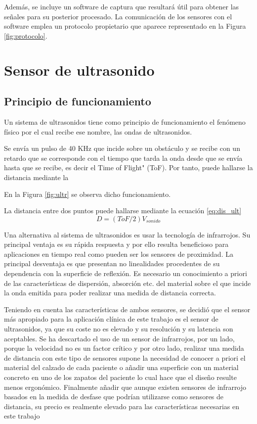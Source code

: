 Además, se incluye un software de captura que resultará útil para obtener las señales para su posterior procesado. La comunicación de los sensores con el software emplea un protocolo propietario que aparece representado en la Figura \ref{fig:protocolo}.

	
\section{Sensor de ultrasonido}

\subsection{Principio de funcionamiento}
Un sistema de ultrasonidos tiene como principio de funcionamiento el fenómeno físico por el cual recibe ese nombre, las ondas de ultrasonidos.

Se envía un pulso de 40 KHz que incide sobre un obstáculo y se recibe con un retardo que se corresponde con el tiempo que tarda la onda desde que se envía hasta que se recibe, es decir el Time of Flight" (ToF). Por tanto, puede hallarse la distancia mediante la 

	 En la Figura \ref{fig:ultr} se observa dicho funcionamiento.

La distancia entre dos puntos puede hallarse mediante la ecuación \ref{eq:dis_ult}
	\begin{equation}\label{eq:dis_ult}
	D = (ToF/2)V_{sonido}
	\end{equation}
	
Una alternativa al sistema de ultrasonidos es usar la tecnología de infrarrojos. Su principal ventaja es su rápida respuesta y por ello resulta beneficioso para aplicaciones en tiempo real como pueden ser los sensores de proximidad. La principal desventaja es que presentan no linealidades procedentes de su dependencia con la superficie de reflexión. Es necesario un conocimiento a priori de las características de dispersión, absorción etc. del material sobre el que incide la onda emitida para poder realizar una medida de distancia correcta. 

Teniendo en cuenta las características de ambos sensores, se decidió que el sensor más apropiado para la aplicación clínica de este trabajo es el sensor de ultrasonidos, ya que su coste no es elevado y su resolución y su latencia son aceptables. Se ha descartado el uso de un sensor de infrarrojos, por un lado, porque la velocidad no es un factor crítico y por otro lado, realizar una medida de distancia con este tipo de sensores supone la necesidad de conocer a priori el material del calzado de cada paciente o añadir una superficie con un material concreto en uno de los zapatos del paciente lo cual hace que el diseño resulte menos ergonómico. Finalmente añadir que aunque existen sensores de infrarrojo basados en la medida de desfase que podrían utilizarse como sensores de distancia, su precio es realmente elevado para las características necesarias en este trabajo \cite{infra}
	

